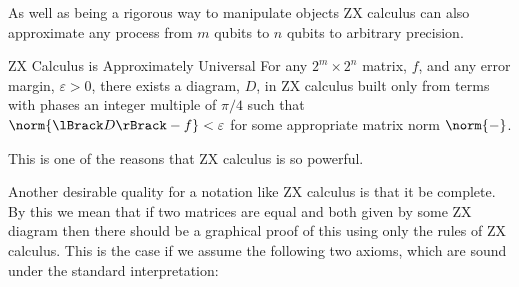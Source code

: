 \documentclass[fleqn]{NotesClass}
\DeclarePairedDelimiter{\denotes}{\lBrack}{\rBrack}
\begin{document}
    As well as being a rigorous way to manipulate objects ZX calculus can also approximate any process from \(m\) qubits to \(n\) qubits to arbitrary precision.
    \begin{thm}{ZX Calculus is Approximately Universal}{}
        For any \(2^m \times 2^n\) matrix, \(f\), and any error margin, \(\varepsilon > 0\), there exists a diagram, \(D\), in ZX calculus built only from terms with phases an integer multiple of \(\pi/4\) such that \(\norm{\denotes{D} - f} < \varepsilon\) for some appropriate matrix norm \(\norm{-}\).
    \end{thm}
    This is one of the reasons that ZX calculus is so powerful.
    
    Another desirable quality for a notation like ZX calculus is that it be complete.
    By this we mean that if two matrices are equal and both given by some ZX diagram then there should be a graphical proof of this using only the rules of ZX calculus.
    This is the case if we assume the following two axioms, which are sound under the standard interpretation:
\end{document}
